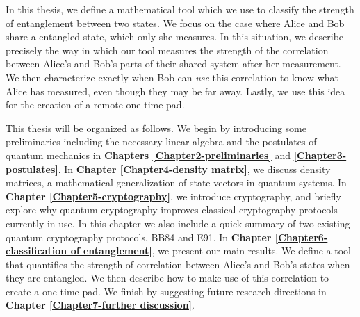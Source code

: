 In this thesis, we define a mathematical tool which we use to classify the strength of entanglement between two states. We focus on the case where Alice and Bob share a entangled state, which only she measures.  In this situation, we describe precisely the way in which our tool measures the strength of the correlation between Alice's and Bob's parts of their shared system after her measurement. We then characterize exactly when Bob can {\emph{use}} this correlation to know what Alice has measured, even though they may be far away.  Lastly, we use this idea for the creation of a remote one-time pad.



This thesis will be organized as follows.  We begin by introducing some preliminaries including the necessary linear algebra and the postulates of quantum mechanics in \textbf{Chapters \ref{Chapter2-preliminaries}} and  \textbf{\ref{Chapter3-postulates}}. In \textbf{Chapter \ref{Chapter4-density matrix}}, we discuss density matrices, a mathematical generalization of state vectors in quantum systems. In \textbf{Chapter \ref{Chapter5-cryptography}}, we introduce cryptography, and briefly explore why quantum cryptography improves classical cryptography protocols currently in use.  In this chapter we also include a quick summary of two existing quantum cryptography protocols, BB84 and E91. In \textbf{Chapter \ref{Chapter6-classification of entanglement}}, we present our main results. We define a tool that quantifies the strength of correlation between Alice's and Bob's states when they are entangled. We then describe how to make use of this correlation to create a one-time pad.  We finish by suggesting future research directions in \textbf{Chapter \ref{Chapter7-further discussion}}.



